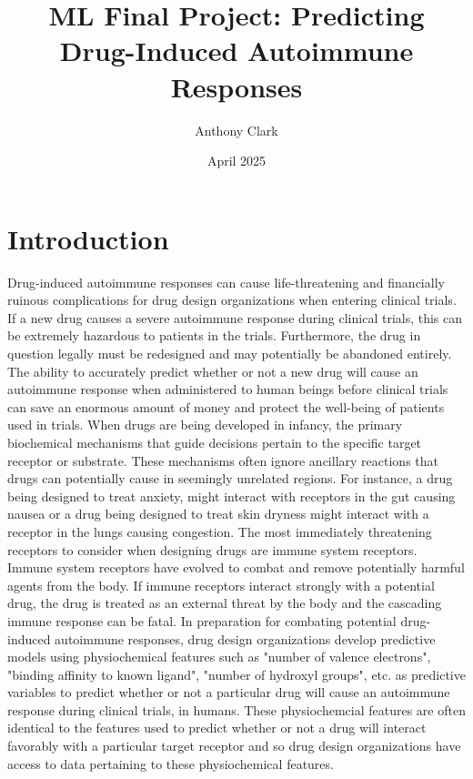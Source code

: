 \documentclass{article}
\title{ML Final Project: Predicting Drug-Induced Autoimmune Responses}
\author{Anthony Clark}
\date{April 2025}
\begin{document}
\maketitle

\section{Introduction}

Drug-induced autoimmune responses can cause life-threatening and financially ruinous complications for drug design organizations when entering clinical trials. If a new drug causes a severe autoimmune response during clinical trials, this can be extremely hazardous to patients in the trials. Furthermore, the drug in question legally must be redesigned and may potentially be abandoned entirely. The ability to accurately predict whether or not a new drug will cause an autoimmune response when administered to human beings before clinical trials can save an enormous amount of money and protect the well-being of patients used in trials. When drugs are being developed in infancy, the primary biochemical mechanisms that guide decisions pertain to the specific target receptor or substrate. These mechanisms often ignore ancillary reactions that drugs can potentially cause in seemingly unrelated regions. For instance, a drug being designed to treat anxiety, might interact with receptors in the gut causing nausea or a drug being designed to treat skin dryness might interact with a receptor in the lungs causing congestion. The most immediately threatening receptors to consider when designing drugs are immune system receptors. Immune system receptors have evolved to combat and remove potentially harmful agents from the body. If immune receptors interact strongly with a potential drug, the drug is treated as an external threat by the body and the cascading immune response can be fatal. In preparation for combating potential drug-induced autoimmune responses, drug design organizations develop predictive models using physiochemical features such as "number of valence electrons", "binding affinity to {known} ligand", "number of hydroxyl groups", etc. as predictive variables to predict whether or not a particular drug will cause an autoimmune response during clinical trials, in humans. These physiochemcial features are often identical to the features used to predict whether or not a drug will interact favorably with a particular target receptor and so drug design organizations have access to data pertaining to these physiochemical features. 
\end{document}
